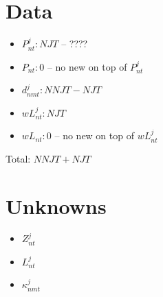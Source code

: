 \documentclass[12pt,oneside,a4paper]{article}
\begin{document}
\section{Data} %
\label{sec:solve_for_z_w_and_trade_cost}

\begin{itemize}
	\item $P_{nt}^j : NJT$ -- ????
	\item $P_{nt} : 0$ -- no new on top of $P_{nt}^j$
	\item $d_{nmt}^j : NNJT - NJT$
	\item $w\!L_{nt}^j : NJT$
	\item $w\!L_{nt} : 0$ -- no new on top of $w\!L_{nt}^j$
\end{itemize}

Total: $NNJT + NJT$

\section{Unknowns} %

\begin{itemize}
	\item $Z_{nt}^j$
	\item $L_{nt}^j$
	\item $\kappa_{nmt}^j$
\end{itemize}



\end{document}
